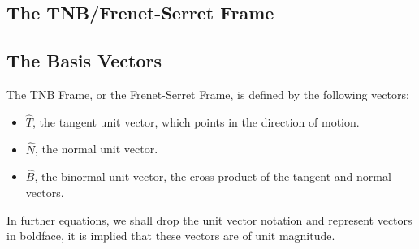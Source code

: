 \documentclass{article}
\begin{document}
	\begin{flushleft}
	
	\color{blue}
	\section{The TNB/Frenet-Serret Frame}
	\subsection{The Basis Vectors}
	\color{black}
	
	The TNB Frame,  or the Frenet-Serret Frame, is defined by the following vectors: 
	\begin{itemize}
		\item $\hat{T}$, the tangent unit vector,  which points in the direction of motion.
		\item $\hat{N}$, the normal unit vector.
		\item $\hat{B}$, the binormal unit vector,  the cross product of the tangent and normal vectors.
	\end{itemize}
	In further equations,  we shall drop the unit vector notation and represent vectors in boldface,  it is implied 
	that these vectors are of unit magnitude.  \\	
	

\end{flushleft}
\end{document}
